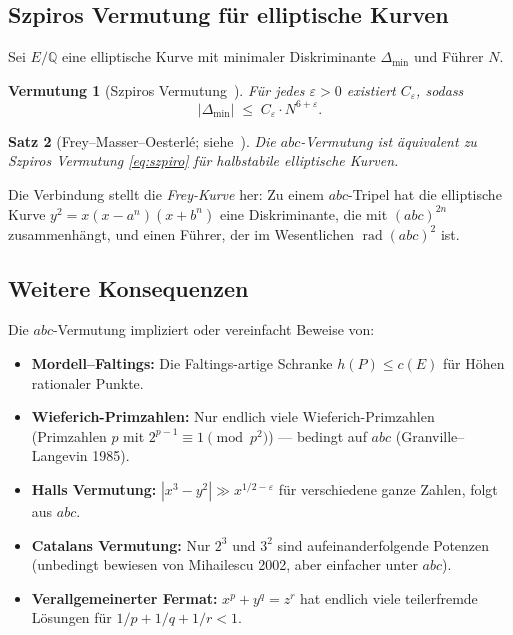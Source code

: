 \documentclass[12pt,a4paper]{article}
\newtheorem{theorem}{Satz}[section]
\newtheorem{conjecture}[theorem]{Vermutung}
\theoremstyle{remark}
\begin{document}
\subsection{Szpiros Vermutung für elliptische Kurven}

Sei $E/\mathbb{Q}$ eine elliptische Kurve mit minimaler Diskriminante $\Delta_{\min}$
und Führer $N$.

\begin{conjecture}[Szpiros Vermutung~\cite{Szpiro1981}]
  Für jedes $\varepsilon>0$ existiert $C_\varepsilon$, sodass
  \begin{equation}\label{eq:szpiro}
    |\Delta_{\min}| \;\leq\; C_\varepsilon \cdot N^{6+\varepsilon}.
  \end{equation}
\end{conjecture}

\begin{theorem}[Frey--Masser--Oesterlé; siehe~\cite{Silverman1994}]
  Die $abc$-Vermutung ist äquivalent zu Szpiros Vermutung \eqref{eq:szpiro} für
  halbstabile elliptische Kurven.
\end{theorem}

Die Verbindung stellt die \emph{Frey-Kurve} her: Zu einem $abc$-Tripel hat die
elliptische Kurve $y^2 = x(x-a^n)(x+b^n)$ eine Diskriminante, die mit $(abc)^{2n}$
zusammenhängt, und einen Führer, der im Wesentlichen $\operatorname{rad}(abc)^2$ ist.

\subsection{Weitere Konsequenzen}

Die $abc$-Vermutung impliziert oder vereinfacht Beweise von:
\begin{itemize}[nosep]
  \item \textbf{Mordell--Faltings:} Die Faltings-artige Schranke $h(P)\leq c(E)$
    für Höhen rationaler Punkte.
  \item \textbf{Wieferich-Primzahlen:} Nur endlich viele Wieferich-Primzahlen
    (Primzahlen $p$ mit $2^{p-1}\equiv1\pmod{p^2}$) — bedingt auf $abc$
    (Granville--Langevin 1985).
  \item \textbf{Halls Vermutung:} $|x^3 - y^2| \gg x^{1/2 - \varepsilon}$
    für verschiedene ganze Zahlen, folgt aus $abc$.
  \item \textbf{Catalans Vermutung:} Nur $2^3$ und $3^2$ sind aufeinanderfolgende
    Potenzen (unbedingt bewiesen von Mihailescu 2002, aber einfacher unter $abc$).
  \item \textbf{Verallgemeinerter Fermat:} $x^p + y^q = z^r$ hat endlich viele
    teilerfremde Lösungen für $1/p+1/q+1/r < 1$.
\end{itemize}
\end{document}
